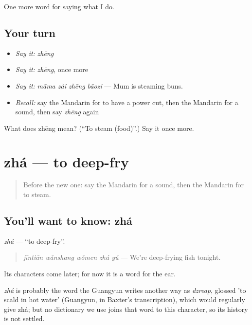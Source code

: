 \begin{grammarlens}[title={What you've built}]
One more word for saying what I do.
\end{grammarlens}

\subsection*{Your turn}
\begin{itemize}
\raggedright
  \item \emph{Say it:} \emph{zhēng}
  \item \emph{Say it:} \emph{zhēng}, once more
  \item \emph{Say it:} \emph{māma zài zhēng bāozi} — Mum is steaming buns.
  \item \emph{Recall:} say the Mandarin for to have a power cut, then the Mandarin for a sound, then say \emph{zhēng} again
\end{itemize}

\begin{tcolorbox}[breakable,colback=teal!4,colframe=teal!35!black,title={Before you move on}]
What does zhēng mean? (\textquotedblleft{}To steam (food)\textquotedblright{}.) Say it once more.
\end{tcolorbox}
\section[zhá]{zhá — to deep-fry}

\label{lesson:ZH-C168-zha}



\begin{quote}
Before the new one: say the Mandarin for a sound, then the Mandarin for to steam.
\end{quote}

\subsection*{You'll want to know: zhá}
\emph{zhá} — \textquotedblleft{}to deep-fry\textquotedblright{}.

\begin{quote}
\emph{jīntiān wǎnshang wǒmen zhá yú} — We're deep-frying fish tonight.
\end{quote}

Its characters come later; for now it is a word for the ear.

\begin{cousinweb}
\emph{zhá} is probably the word the Guangyun writes another way as \emph{dzreap}, glossed 'to scald in hot water' (Guangyun, in Baxter's transcription), which would regularly give zhá; but no dictionary we use joins that word to this character, so its history is not settled.
\end{cousinweb}

